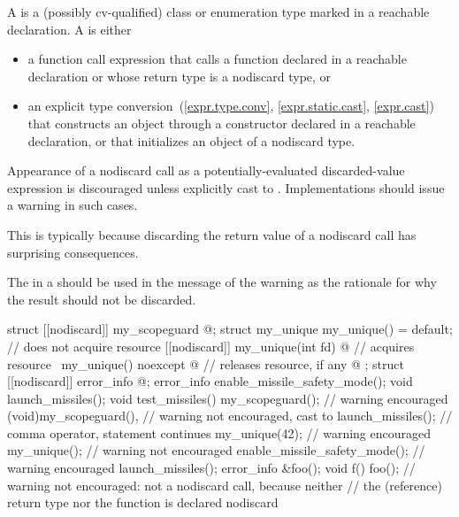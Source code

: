 \pnum
A  is
a (possibly cv-qualified) class or enumeration type
marked  in a reachable declaration.
A  is either
\begin{itemize}
\item
  a function call expression
  that calls a function declared  in a reachable declaration or
  whose return type is a nodiscard type, or
\item
  an explicit type
  conversion~(\ref{expr.type.conv}, \ref{expr.static.cast}, \ref{expr.cast})
  that constructs an object through
  a constructor declared  in a reachable declaration, or
  that initializes an object of a nodiscard type.
\end{itemize}

\pnum
\recommended
Appearance of a nodiscard call as
a potentially-evaluated discarded-value expression
is discouraged unless explicitly cast to .
Implementations should issue a warning in such cases.
\begin{note}
This is typically because discarding the return value
of a nodiscard call has surprising consequences.
\end{note}
The 
in a  
should be used in the message of the warning
as the rationale for why the result should not be discarded.

\pnum
\begin{example}
\begin{codeblock}
struct [[nodiscard]] my_scopeguard { @\commentellip@ };
struct my_unique {
  my_unique() = default;                                // does not acquire resource
  [[nodiscard]] my_unique(int fd) { @\commentellip@ }         // acquires resource
  ~my_unique() noexcept { @\commentellip@ }                   // releases resource, if any
  @\commentellip@
};
struct [[nodiscard]] error_info { @\commentellip@ };
error_info enable_missile_safety_mode();
void launch_missiles();
void test_missiles() {
  my_scopeguard();              // warning encouraged
  (void)my_scopeguard(),        // warning not encouraged, cast to 
    launch_missiles();          // comma operator, statement continues
  my_unique(42);                // warning encouraged
  my_unique();                  // warning not encouraged
  enable_missile_safety_mode(); // warning encouraged
  launch_missiles();
}
error_info &foo();
void f() { foo(); }             // warning not encouraged: not a nodiscard call, because neither
                                // the (reference) return type nor the function is declared nodiscard
\end{codeblock}
\end{example}

